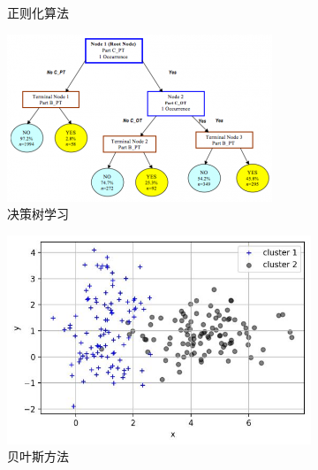 \begin{figure}[htp]
\begin{subfigure}{.33\textwidth}
		 \caption{正则化算法}
		 \label{fig:2.sub.33}
	 \end{subfigure}%

	 \medskip
	 \begin{subfigure}{.33\textwidth}
	   \centering
	   \includegraphics[width=\linewidth]{ch02/img/ch2/2.1/4.png}
	   \caption{决策树学习}
	   \label{fig:2.sub.4}
	 \end{subfigure}\hfil%
	 \begin{subfigure}{.33\textwidth}
	   \centering
	   \includegraphics[width=\linewidth]{ch02/img/ch2/2.1/5.jpg}
	   \caption{贝叶斯方法}
	   \label{fig:2.sub.5}
	 \end{subfigure}\hfil%
	 \begin{subfigure}{.33\textwidth}
	   \centering

\end{subfigure}
\end{figure}
